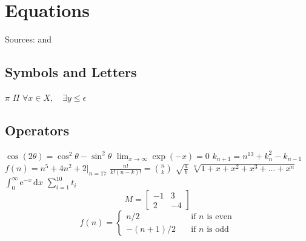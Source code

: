 \chapter{Equations}
\label{ch:equations}
Sources: \cite{wb-eq} and \cite{sl-eq}

\section{Symbols and Letters}
$\pi$
\newline
$\Pi$
\newline
$\forall x \in X, \quad \exists y \leq \epsilon$

\section{Operators}
$\cos (2\theta) = \cos^2 \theta - \sin^2 \theta$
\newline \newline
$\lim_{x \to \infty} \exp(-x) = 0$
\newline \newline
$k_{n+1} = n^{13} + k_n^2 - k_{n-1}$
\newline \newline
$f(n) = n^5 + 4n^2 + 2 |_{n=17}$
\newline \newline
$\frac{n!}{k!(n-k)!} = \binom{n}{k}$
\newline \newline
$\sqrt{\frac{a}{b}}$
\newline \newline
$\sqrt[n]{1+x+x^2+x^3+\dots+x^n}$
\newline \newline
$\displaystyle\int_0^\infty \mathrm{e}^{-x}\,\mathrm{d}x$
\newline \newline
$\displaystyle\sum_{i=1}^{10} t_i$
\newline \newline
\[ M =
\begin{bmatrix}
	-1 & 3 \\
	2 & -4
\end{bmatrix} 
\]
\newline \newline
\[ f(n) =
\begin{cases}
n/2       & \quad \text{if } n \text{ is even}\\
-(n+1)/2  & \quad \text{if } n \text{ is odd}
\end{cases}
\]

